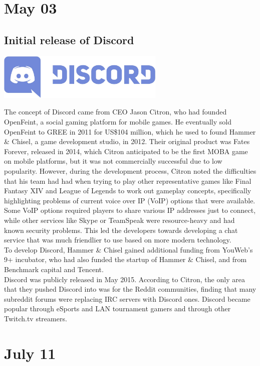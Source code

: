 \documentclass[11pt]{report}
\begin{document}
\section{May 03}
\subsection{Initial release of Discord}
\vspace{2mm}\begin{center}\includegraphics[width=8cm]{./img/discordLogo.jpg}\end{center}
The concept of Discord came from CEO Jason Citron, who had founded OpenFeint, a social gaming platform for mobile games. He eventually sold OpenFeint to GREE in 2011 for US\$104 million, which he used to found Hammer \& Chisel, a game development studio, in 2012. Their original product was Fates Forever, released in 2014, which Citron anticipated to be the first MOBA game on mobile platforms, but it was not commercially successful due to low popularity. However, during the development process, Citron noted the difficulties that his team had had when trying to play other representative games like Final Fantasy XIV and League of Legends to work out gameplay concepts, specifically highlighting problems of current voice over IP (VoIP) options that were available. Some VoIP options required players to share various IP addresses just to connect, while other services like Skype or TeamSpeak were resource-heavy and had known security problems. This led the developers towards developing a chat service that was much friendlier to use based on more modern technology.\\
\indent To develop Discord, Hammer \& Chisel gained additional funding from YouWeb's 9+ incubator, who had also funded the startup of Hammer \& Chisel, and from Benchmark capital and Tencent.\\
\indent Discord was publicly released in May 2015. According to Citron, the only area that they pushed Discord into was for the Reddit communities, finding that many subreddit forums were replacing IRC servers with Discord ones. Discord became popular through eSports and LAN tournament gamers and through other Twitch.tv streamers.
\section{July 11}
\end{document}
